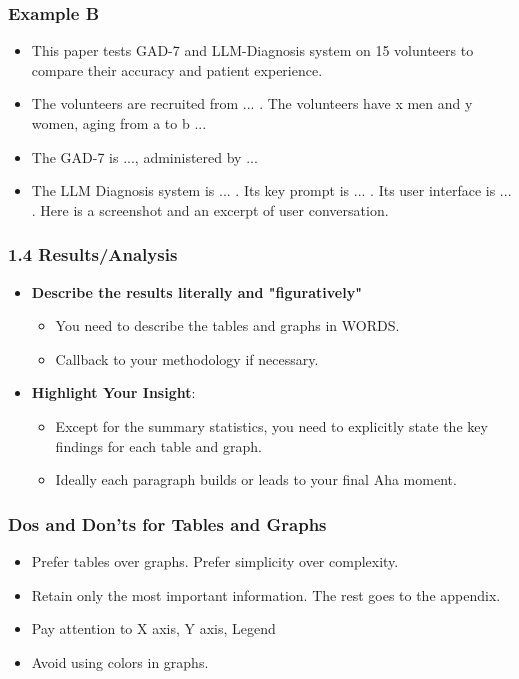 \documentclass{beamer}
\begin{document}
        
    \begin{frame}
    \frametitle{Example B}
    \begin{itemize}
        \item This paper tests GAD-7 and LLM-Diagnosis system on 15 volunteers to compare their accuracy and patient experience.
        \item The volunteers are recruited from ... . The volunteers have x men and y women, aging from a to b ...
        \item The GAD-7 is ..., administered by ... 
        \item The LLM Diagnosis system is ... . Its key prompt is ... . Its user interface is ... . Here is a screenshot and an excerpt of user conversation.
    \end{itemize}
    \end{frame}
    
    
    
    \begin{frame}
    \frametitle{1.4 Results/Analysis}
    \begin{itemize}
        \item \textbf{Describe the results literally and "figuratively"}
        \begin{itemize}
            \item You need to describe the tables and graphs in WORDS.
            \item Callback to your methodology if necessary.
        \end{itemize}
        \item \textbf{Highlight Your Insight}:
        \begin{itemize}
            \item Except for the summary statistics, you need to explicitly state the key findings for each table and graph.
            \item Ideally each paragraph builds or leads to your final Aha moment.
        \end{itemize}
    \end{itemize}
    \end{frame}
    
    \begin{frame}
    \frametitle{Dos and Don'ts for Tables and Graphs}
    \begin{itemize}
        \item Prefer tables over graphs. Prefer simplicity over complexity.
        \item Retain only the most important information. The rest goes to the appendix.
        \item Pay attention to X axis, Y axis, Legend
        \item Avoid using colors in graphs.
    \end{itemize}
    \end{frame}
    
\end{document}
